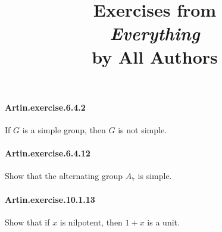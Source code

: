 \documentclass{article}
\title{\textbf{
Exercises from \\
\textit{Everything} \\
by All Authors
}}
\date{}
\begin{document}
\maketitle





\paragraph{Artin.exercise.6.4.2} If $G$ is a simple group, then $G$ is not simple.

\paragraph{Artin.exercise.6.4.12} Show that the alternating group $A_7$ is simple.

\paragraph{Artin.exercise.10.1.13} Show that if $x$ is nilpotent, then $1 + x$ is a unit.

\end{document}
